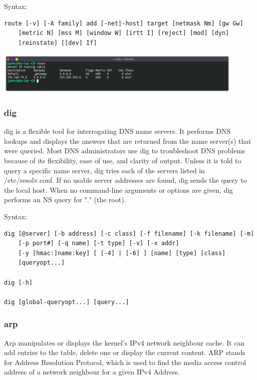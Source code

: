 Syntax:
\begin{lstlisting}
route [-v] [-A family] add [-net|-host] target [netmask Nm] [gw Gw] 
	[metric N] [mss M] [window W] [irtt I] [reject] [mod] [dyn] 
	[reinstate] [[dev] If]
\end{lstlisting}

\begin{center}
	\includegraphics[width=0.90\textwidth]{img/p1/ss5.png}
\end{center}


\subsubsection{dig}
dig is a flexible tool for interrogating DNS name servers. It performs DNS lookups and displays the answers 
that are returned from the name server(s) that were queried. Most DNS administrators use dig to troubleshoot 
DNS problems because of its flexibility, ease of use, and clarity of output.
Unless it is told to query a specific name server, dig tries each of the servers listed in /etc/resolv.conf. 
If no usable server addresses are found, dig sends the query to the local host. When no command-line arguments 
or options are given, dig performs an NS query for "." (the root).
\linebreak[2]

Syntax:
\begin{lstlisting}
dig [@server] [-b address] [-c class] [-f filename] [-k filename] [-m] 
	[-p port#] [-q name] [-t type] [-v] [-x addr] 
	[-y [hmac:]name:key] [ [-4] | [-6] ] [name] [type] [class] 
	[queryopt...]

dig [-h]

dig [global-queryopt...] [query...]
\end{lstlisting}


\subsubsection{arp}
Arp manipulates or displays the kernel's IPv4 network neighbour cache. It can add entries to the table, delete one or
display the current content.
ARP stands for Address Resolution Protocol, which is used to find the media access control address of a network neighbour
for a given IPv4 Address.
\linebreak[2]

